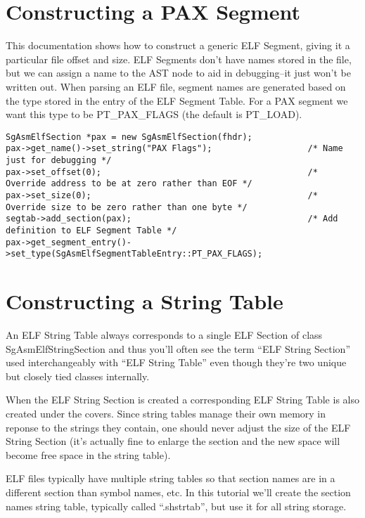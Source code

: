 \section{Constructing a PAX Segment}

This documentation shows how to construct a generic ELF Segment,
giving it a particular file offset and size. ELF Segments don't have
names stored in the file, but we can assign a name to the AST node to
aid in debugging--it just won't be written out. When parsing an ELF
file, segment names are generated based on the type stored in the
entry of the ELF Segment Table. For a PAX segment we want this type to
be PT_PAX_FLAGS (the default is PT_LOAD).

\begin{verbatim}
SgAsmElfSection *pax = new SgAsmElfSection(fhdr);
pax->get_name()->set_string("PAX Flags");                   /* Name just for debugging */
pax->set_offset(0);                                         /* Override address to be at zero rather than EOF */
pax->set_size(0);                                           /* Override size to be zero rather than one byte */
segtab->add_section(pax);                                   /* Add definition to ELF Segment Table */
pax->get_segment_entry()->set_type(SgAsmElfSegmentTableEntry::PT_PAX_FLAGS);
\end{verbatim}

\section{Constructing a String Table}

An ELF String Table always corresponds to a single ELF Section of
class SgAsmElfStringSection and thus you'll often see the term ``ELF
String Section'' used interchangeably with ``ELF String Table'' even
though they're two unique but closely tied classes internally.

When the ELF String Section is created a corresponding ELF String
Table is also created under the covers. Since string tables manage
their own memory in reponse to the strings they contain, one should
never adjust the size of the ELF String Section (it's actually fine to
enlarge the section and the new space will become free space in the
string table).

ELF files typically have multiple string tables so that section names
are in a different section than symbol names, etc. In this tutorial
we'll create the section names string table, typically called
``.shstrtab'', but use it for all string storage.


